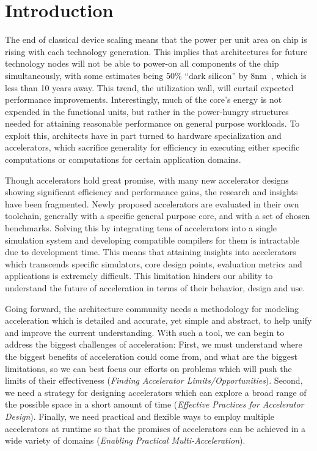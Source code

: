 \section{Introduction}

The end of classical device scaling means that the power per unit area on chip
is rising with each technology generation.  This implies that architectures for
future technology nodes will not be able to power-on all components of the chip
simultaneously, with some estimates being 50\% ``dark silicon'' by
8nm~\cite{isca11:dark-silicon}, which is less than 10 years away.  This trend,
the utilization wall, will curtail expected performance improvements.
Interestingly, much of the core's energy is not expended in the functional
units, but rather in the power-hungry structures needed for
attaining reasonable performance on general purpose workloads.  To exploit this,
architects have in part turned to hardware specialization and
accelerators, which sacrifice generality for efficiency in executing either
specific computations or computations for certain application domains.

Though accelerators hold great promise, with many new accelerator designs
showing significant efficiency and performance gains, the research and 
insights have been fragmented.  Newly proposed accelerators are evaluated 
in their own toolchain, generally with a specific general purpose core, and with 
a set of chosen benchmarks.  Solving this by integrating tens of accelerators 
into a single simulation system and developing compatible compilers 
for them is intractable due to development time.  This means that attaining 
insights into accelerators which transcends specific simulators, core design
points, evaluation metrics and applications is extremely difficult.
This limitation hinders our ability to understand the future of acceleration 
in terms of their behavior, design and use.


Going forward, the architecture community needs a methodology for modeling
acceleration which is detailed and accurate, yet simple and abstract, to help
unify and improve the current understanding.  With such a
tool, we can begin to address the biggest challenges of acceleration:  First,
we must understand where the biggest benefits of acceleration could come from,
and what are the biggest limitations, so we can best focus our efforts on
problems which will push the limits of their effectiveness (\emph{Finding
Accelerator Limits/Opportunities}).  Second, we need a strategy for designing
accelerators which can explore a broad range of the possible space in a short
amount of time (\emph{Effective Practices for Accelerator Design}).  Finally,
we need practical and flexible ways to employ multiple accelerators at
runtime so that the promises of accelerators can be achieved in a
wide variety of domains (\emph{Enabling Practical Multi-Acceleration}).

